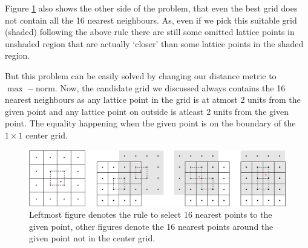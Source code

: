 \documentclass[a4paper, landscape]{article}
\begin{document}
Figure \ref{fig:nearest} also shows the other side of the problem, that even the best grid does not contain all the 16 nearest neighbours. As, even if we pick this suitable grid (shaded) following the above rule there are still some omitted lattice points in unshaded region that are actually `closer' than some lattice points in the shaded region.

But this problem can be easily solved by changing our distance metric to $\max-$norm. Now, the candidate grid we discussed always contains the 16 nearest neighbours as any lattice point in the grid is at atmost 2 units from the given point and any lattice point on outside is atleast 2 units from the given point. The equality happening when the given point is on the boundary of the $1\times1$ center grid.
\begin{figure}[H]
    \centering
    \includegraphics[width=\linewidth]{nearest_point.pdf}
    \caption{Leftmost figure denotes the rule to select 16 nearest points to the given point, other figures denote the 16 nearest points around the given point not in the center grid.}
    \label{fig:nearest}
\end{figure}
\end{document}
